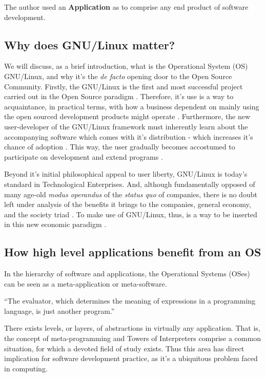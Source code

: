 \documentclass[
12pt,				%
openright,			%
oneside,			%
a4paper,			%
brazil,				%
english,			  %
]{abntex2}
\begin{document}
The author used an \textbf{Application} as to comprise any end product of software development.

\subsection{Why does GNU/Linux matter?}

We will discuss, as a brief introduction, what is the Operational System
(OS) GNU/Linux, and why it's the \textit{de facto} opening door to the
Open Source Community. Firstly, the GNU/Linux is the first and most
successful project carried out in the Open Source paradigm
\cite{tu2000evolution,west2001open}. Therefore, it's use is a way to
acquaintance, in practical terms, with how a business dependent on mainly
using the open sourced development products might operate \cite{fink2003business}.   
Furthermore, the new user-developer of the GNU/Linux framework must
inherently learn about the accompanying software which comes with it's
distribution - which increases it's chance of adoption
\cite{west2001open}. This way, the user gradually becomes accostumed to
participate on development and extend programs \cite{hertel2003motivation}.

Beyond it's initial philosophical appeal to user liberty, GNU/Linux is
today's standard in Technological Enterprises. And, although
fundamentally opposed of many age-old \textit{modus operandus} of the
\textit{status quo} of companies, there is no doubt left under
analysis of the benefits it brings to the companies, general economy, and
the society triad \cite{moody2009rebel}. To make use of GNU/Linux,
thus, is a way to be inserted in this new economic paradigm \cite{hippel2003open,peters2009open}.

\subsection{How high level applications benefit from an OS}

In the hierarchy of software and applications, the Operational Systems (OSes) can be seen as a meta-application or meta-software. 

``The evaluator, which determines the meaning of expressions in a
programming language, is just another program.'' \cite{abelson1996structure}

There exists levels, or layers, of abstractions in virtually any
application. That is, the concept of meta-programming and Towers of
Interpreters comprise a common situation, for which a devoted field of
study exists. Thus this area has direct implication for software
development practice, as it's a ubiquitous problem faced in computing.
\end{document}
